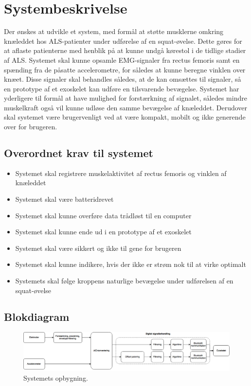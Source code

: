 \section{Systembeskrivelse}
Der ønskes at udvikle et system, med formål at støtte musklerne omkring knæleddet hos ALS-patienter under udførelse af en squat-øvelse. Dette gøres for at aflaste patienterne med henblik på at kunne undgå kørestol i de tidlige stadier af ALS. 
Systemet skal kunne opsamle EMG-signaler fra rectus femoris samt en spænding fra de påsatte accelerometre, for således at kunne beregne vinklen over knæet. Disse signaler skal behandles således, at de kan omsættes til signaler, så en prototype af et exoskelet kan udføre en tilsvarende bevægelse. 
Systemet har yderligere til formål at have mulighed for forstærkning af signalet, således mindre muskelkraft også vil kunne udløse den samme bevægelse af knæleddet. 
Derudover skal systemet være brugervenligt ved at være kompakt, mobilt og ikke generende over for brugeren.

\subsection{Overordnet krav til systemet}  \label{sec:overordnet_krav}
\begin{itemize}
\item Systemet skal registrere muskelaktivitet af rectus femoris og vinklen af knæleddet
\item Systemet skal være batteridrevet
\item Systemet skal kunne overføre data trådløst til en computer
\item Systemet skal kunne ende ud i en prototype af et exoskelet
\item Systemet skal være sikkert og ikke til gene for brugeren 
\item Systemet skal kunne indikere, hvis der ikke er strøm nok til at virke optimalt
\item Systemets skal følge kroppens naturlige bevægelse under udførelsen af en squat-øvelse
\end{itemize}


\subsection{Blokdiagram} \label{sec:blokdiagram} 
\begin{figure}[H]
\centering
\includegraphics[width=1\textwidth]{figures/blokdiagram.png}
\caption{Systemets opbygning.}
\label{fig:blokdiagram}
\end{figure}

